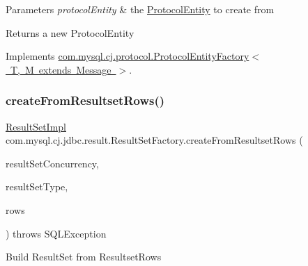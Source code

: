 \begin{DoxyParams}{Parameters}
{\em protocol\+Entity} & the \mbox{\hyperlink{}{Protocol\+Entity}} to create from \\
\hline
\end{DoxyParams}
\begin{DoxyReturn}{Returns}
a new Protocol\+Entity 
\end{DoxyReturn}


Implements \mbox{\hyperlink{interfacecom_1_1mysql_1_1cj_1_1protocol_1_1_protocol_entity_factory_a282b14fecc86c7202cd9361333235ef8}{com.\+mysql.\+cj.\+protocol.\+Protocol\+Entity\+Factory$<$ T, M extends Message $>$}}.

\mbox{\label{classcom_1_1mysql_1_1cj_1_1jdbc_1_1result_1_1_result_set_factory_a30cd3345dd9bdba80ee0ab3f3708da57}} 
\subsubsection{\texorpdfstring{create\+From\+Resultset\+Rows()}{createFromResultsetRows()}}
{\footnotesize\ttfamily \mbox{\hyperlink{classcom_1_1mysql_1_1cj_1_1jdbc_1_1result_1_1_result_set_impl}{Result\+Set\+Impl}} com.\+mysql.\+cj.\+jdbc.\+result.\+Result\+Set\+Factory.\+create\+From\+Resultset\+Rows (\begin{DoxyParamCaption}\item[{int}]{result\+Set\+Concurrency,  }\item[{int}]{result\+Set\+Type,  }\item[{\mbox{\hyperlink{interfacecom_1_1mysql_1_1cj_1_1protocol_1_1_resultset_rows}{Resultset\+Rows}}}]{rows }\end{DoxyParamCaption}) throws S\+Q\+L\+Exception}

Build Result\+Set from Resultset\+Rows


